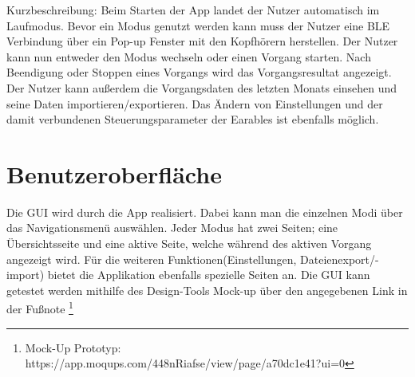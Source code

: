 \documentclass[a4paper,12pt]{article}
\begin{document}
Kurzbeschreibung: Beim Starten der App landet der Nutzer automatisch im Laufmodus. Bevor ein Modus genutzt werden kann muss der Nutzer eine BLE Verbindung über ein Pop-up Fenster mit den Kopfhörern herstellen. Der Nutzer kann nun entweder den Modus wechseln oder einen \Gls{Vorgang} starten. Nach Beendigung oder Stoppen eines Vorgangs wird das Vorgangsresultat angezeigt. Der Nutzer kann außerdem die Vorgangsdaten des letzten Monats einsehen und seine Daten importieren/exportieren. Das Ändern von Einstellungen und der damit verbundenen \Gls{Steuerungsparameter} der \Gls{Earables} ist ebenfalls möglich.
\section{Benutzeroberfläche}
Die \Gls{GUI} wird durch die App realisiert. Dabei kann man die einzelnen Modi über das Navigationsmenü auswählen. Jeder Modus hat zwei Seiten; eine Übersichtsseite und eine aktive Seite, welche während des aktiven \Gls{Vorgang} angezeigt wird. Für die weiteren Funktionen(Einstellungen, Dateienexport/-import) bietet die Applikation ebenfalls spezielle Seiten an.
Die \Gls{GUI} kann getestet werden mithilfe des Design-Tools \glqq Mock-up\grqq{} über den angegebenen Link in der Fußnote \footnote[1]{Mock-Up Prototyp: https://app.moqups.com/448nRiafse/view/page/a70dc1e41?ui=0}
\end{document}
